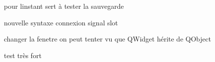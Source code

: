 
\begin{DoxyRefList}
\item[\label{test__test000002}%
\Hypertarget{test__test000002}%
Member \hyperlink{class_main_menu_acacb97bab2a77bd09dedccea22a32116}{Main\+Menu\+:\+:go\+For\+Puzzle} (void)]pour l\textquotesingle{}instant sert à tester la sauvegarde  
\item[\label{test__test000001}%
\Hypertarget{test__test000001}%
Member \hyperlink{class_main_menu_a891bed1e0edb5492671c332cb89b7a9a}{Main\+Menu\+:\+:Main\+Menu} (Q\+Widget $\ast$parent=nullptr)]nouvelle syntaxe connexion signal slot  
\item[\label{test__test000004}%
\Hypertarget{test__test000004}%
Member \hyperlink{class_robin_main_window_a55f7775f5daefb2099a51e97d50df666}{Robin\+Main\+Window\+:\+:Robin\+Main\+Window} (Q\+Widget $\ast$parent=0)]changer la fenetre on peut tenter vu que Q\+Widget hérite de Q\+Object 

test très fort  
\item[\label{test__test000006}%
\Hypertarget{test__test000006}%
Member \hyperlink{class_super_simon_af12663f8a26a971a508a40a33d0afceb}{Super\+Simon\+:\+:delay} (int \&sec)]
\end{DoxyRefList}